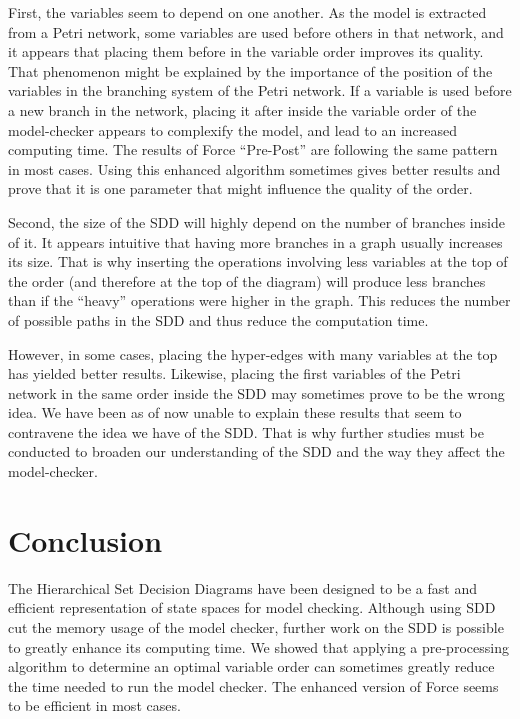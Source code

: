 \documentclass[12pt]{report}
\begin{document}
First, the variables seem to depend on one another. As the model is extracted from a Petri network, some variables are used before others in that network, and it appears that placing them before in the variable order improves its quality. That phenomenon might be explained by the importance of the position of the variables in the branching system of the Petri network. If a variable is used before a new branch in the network, placing it after inside the variable order of the model-checker appears to complexify the model, and lead to an increased computing time. The results of Force \enquote{Pre-Post} are following the same pattern in most cases. Using this enhanced algorithm sometimes gives better results and prove that it is one parameter that might influence the quality of the order.

Second, the size of the SDD will highly depend on the number of branches inside of it. It appears intuitive that having more branches in a graph usually increases its size. That is why inserting the operations involving less variables at the top of the order (and therefore at the top of the diagram) will produce less branches than if the \enquote{heavy} operations were higher in the graph. This reduces the number of possible paths in the SDD and thus reduce the computation time.

However, in some cases, placing the hyper-edges with many variables at the top has yielded better results. Likewise, placing the first variables of the Petri network in the same order inside the SDD may sometimes prove to be the wrong idea. We have been as of now unable to explain these results that seem to contravene the idea we have of the SDD. That is why further studies must be conducted to broaden our understanding of the SDD and the way they affect the model-checker. 

\newpage
\section*{Conclusion}

The Hierarchical Set Decision Diagrams have been designed to be a fast and efficient representation of state spaces for model checking. Although using SDD cut the memory usage of the model checker, further work on the SDD is possible to greatly enhance its computing time. We showed that applying a pre-processing algorithm to determine an optimal variable order can sometimes greatly reduce the time needed to run the model checker. The enhanced version of Force seems to be efficient in most cases.
\end{document}
